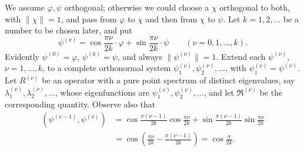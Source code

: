 \documentclass[fontsize=13pt,twoside,openany,headings=normal,parskip=false,bookmarkpackage=false,DIV=calc]{scrbook}
\begin{document}
We assume $\varphi,\psi$ orthogonal; otherwise we could choose a $\chi$ orthogonal to both, with $\|\chi\|=1$, and pass from $\varphi$ to $\chi$ and then from $\chi$ to $\psi$. Let $k=1,2,\ldots$ be a number to be chosen later, and put
\[
\psi^{(\nu)}=\cos\frac{\pi\nu}{2k}\cdot\varphi+\sin\frac{\pi\nu}{2k}\cdot\psi
\qquad(\nu=0,1,\ldots,k).
\]
Evidently $\psi^{(0)}=\varphi$, $\psi^{(k)}=\psi$, and always $\|\psi^{(\nu)}\|=1$. Extend each $\psi^{(\nu)}$, $\nu=1,\ldots,k$, to a complete orthonormal system $\psi_1^{(\nu)},\psi_2^{(\nu)},\ldots$, with $\psi_1^{(\nu)}=\psi^{(\nu)}$. Let $R^{(\nu)}$ be an operator with a pure point spectrum of distinct eigenvalues, say $\lambda_1^{(\nu)},\lambda_2^{(\nu)},\ldots$, whose eigenfunctions are $\psi_1^{(\nu)},\psi_2^{(\nu)},\ldots$, and let $\mathfrak R^{(\nu)}$ be the corresponding quantity. Observe also that
\begin{align*}
(\psi^{(\nu-1)},\psi^{(\nu)})
&=\cos\frac{\pi(\nu-1)}{2k}\cos\frac{\pi\nu}{2k}
+\sin\frac{\pi(\nu-1)}{2k}\sin\frac{\pi\nu}{2k}\\
&=\cos\left(\frac{\pi\nu}{2k}-\frac{\pi(\nu-1)}{2k}\right)=\cos\frac\pi{2k}.
\end{align*}
\end{document}
